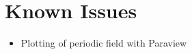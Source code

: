 \chapter{Known Issues}
\label{chap:knownissues}

\begin{itemize}
\item{Plotting of periodic field with Paraview}
\end{itemize}



